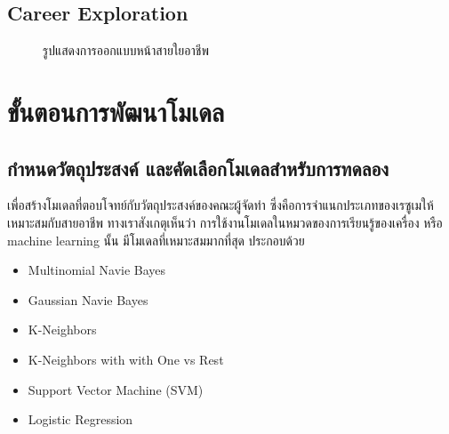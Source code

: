 \subsection{Career Exploration}
\begin{figure}[H]\centering
    \caption{รูปแสดงการออกแบบหน้าสายใยอาชีพ}\label{fig:CE.png}
\end{figure}

\section{ขั้นตอนการพัฒนาโมเดล}
\subsection{กำหนดวัตถุประสงค์ และคัดเลือกโมเดลสำหรับการทดลอง}
เพื่อสร้างโมเดลที่ตอบโจทย์กับวัตถุประสงค์ของคณะผู้จัดทำ ซึ่งคือการจำแนกประเภทของเรซูเมให้เหมาะสมกับสายอาชีพ ทางเราสังเกตุเห็นว่า การใช้งานโมเดลในหมวดของการเรียนรู้ของเครื่อง หรือ machine learning นั้น มีโมเดลที่เหมาะสมมากที่สุด ประกอบด้วย
\begin{itemize}
    \item Multinomial Navie Bayes
    \item Gaussian Navie Bayes
    \item K-Neighbors
    \item K-Neighbors with with One vs Rest
    \item Support Vector Machine (SVM)
    \item Logistic Regression
\end{itemize}

